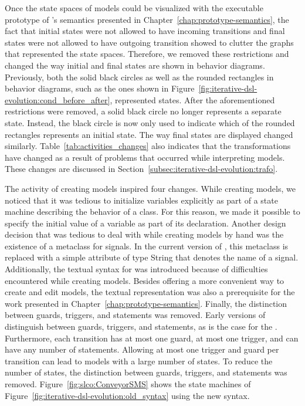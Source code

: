 Once the state spaces of \SLCO models could be visualized with the executable prototype of \SLCO's semantics presented in Chapter~\ref{chap:prototype-semantics}, the fact that initial states were not allowed to have incoming transitions and final states were not allowed to have outgoing transition showed to clutter the graphs that represented the state spaces.
Therefore, we removed these restrictions and changed the way initial and final states are shown in behavior diagrams.
Previously, both the solid black circles as well as the rounded rectangles in behavior diagrams, such as the ones shown in Figure~\ref{fig:iterative-dsl-evolution:cond_before_after}, represented states.
After the aforementioned restrictions were removed, a solid black circle no longer represents a separate state.
Instead, the black circle is now only used to indicate which of the rounded rectangles represents an initial state.
The way final states are displayed changed similarly.
Table~\ref{tab:activities_changes} also indicates that the transformations have changed as a result of problems that occurred while interpreting models.
These changes are discussed in Section~\ref{subsec:iterative-dsl-evolution:trafo}.


The activity of creating models inspired four changes.
While creating models, we noticed that it was tedious to initialize variables explicitly as part of a state machine describing the behavior of a class.
For this reason, we made it possible to specify the initial value of a variable as part of its declaration.
Another design decision that was tedious to deal with while creating models by hand was the existence of a metaclass for signals.
In the current version of \SLCO, this metaclass is replaced with a simple attribute of type String that denotes the name of a signal.
Additionally, the textual syntax for \SLCO was introduced because of difficulties encountered while creating models.
Besides offering a more convenient way to create and edit models, the textual representation was also a prerequisite for the work presented in Chapter~\ref{chap:prototype-semantics}.
Finally, the distinction between guards, triggers, and statements was removed.
Early versions of \SLCO distinguish between guards, triggers, and statements, as is the case for the \UML.
Furthermore, each transition has at most one guard, at most one trigger, and can have any number of statements.
Allowing at most one trigger and guard per transition can lead to models with a large number of states.
To reduce the number of states, the distinction between guards, triggers, and statements was removed.
Figure~\ref{fig:slco:ConveyorSMS} shows the state machines of Figure~\ref{fig:iterative-dsl-evolution:old_syntax} using the new syntax.


